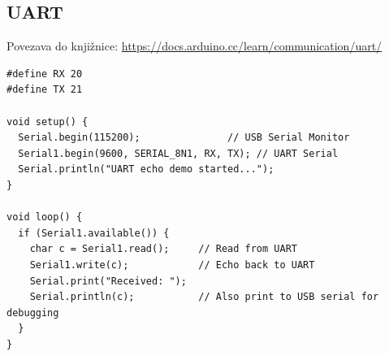 \subsection{UART}
Povezava do knjižnice: \url{https://docs.arduino.cc/learn/communication/uart/}
\begin{lstlisting}[language=Arduino]
#define RX 20
#define TX 21

void setup() {
  Serial.begin(115200);               // USB Serial Monitor
  Serial1.begin(9600, SERIAL_8N1, RX, TX); // UART Serial
  Serial.println("UART echo demo started...");
}

void loop() {
  if (Serial1.available()) {
    char c = Serial1.read();     // Read from UART
    Serial1.write(c);            // Echo back to UART
    Serial.print("Received: ");
    Serial.println(c);           // Also print to USB serial for debugging
  }
}

\end{lstlisting}



